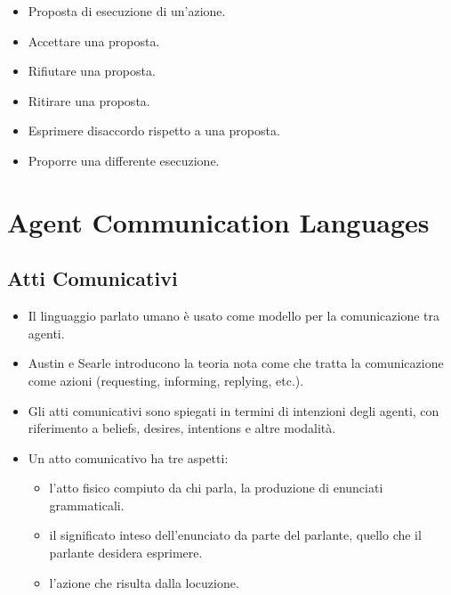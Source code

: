 \begin{itemize}
  \item Proposta di esecuzione di un'azione. 
  \item Accettare una proposta. 
  \item Rifiutare una proposta. 
  \item Ritirare una proposta. 
  \item Esprimere disaccordo rispetto a una proposta. 
  \item Proporre una differente esecuzione.
\end{itemize}

\section{Agent Communication Languages}


\subsection{Atti Comunicativi}


\begin{itemize}
  \item Il linguaggio parlato umano è usato come modello per la comunicazione tra agenti. 
  \item Austin e Searle introducono la teoria nota come  che tratta la comunicazione come azioni (requesting, informing, replying, etc.). 
  \item Gli atti comunicativi sono spiegati in termini di intenzioni degli agenti, con riferimento a beliefs, desires, intentions e altre modalità.
  \item  Un atto comunicativo ha tre aspetti:
    \begin{itemize}
      \item {} l'atto fisico compiuto da chi parla, la produzione di enunciati grammaticali.
      \item {} il significato inteso dell'enunciato da parte del parlante, quello che il parlante desidera esprimere. 
      \item {} l'azione che risulta dalla locuzione.
    \end{itemize}
\end{itemize}

